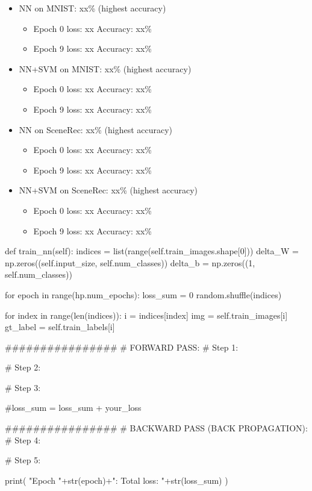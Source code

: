 \begin{itemize}
\item NN on MNIST: xx\% (highest accuracy)
	\begin{itemize}
	\item Epoch 0 loss: xx     Accuracy: xx\%
	\item Epoch 9 loss: xx     Accuracy: xx\%
	\end{itemize}
\item NN+SVM on MNIST: xx\% (highest accuracy)
	\begin{itemize}
	\item Epoch 0 loss: xx     Accuracy: xx\%
	\item Epoch 9 loss: xx     Accuracy: xx\%
	\end{itemize}
\item NN on SceneRec: xx\% (highest accuracy)
	\begin{itemize}
	\item Epoch 0 loss: xx     Accuracy: xx\%
	\item Epoch 9 loss: xx     Accuracy: xx\%
	\end{itemize}
\item NN+SVM on SceneRec: xx\% (highest accuracy)
	\begin{itemize}
	\item Epoch 0 loss: xx     Accuracy: xx\%
	\item Epoch 9 loss: xx     Accuracy: xx\%
	\end{itemize}
\end{itemize}


\pagebreak
\begin{python}
def train_nn(self):
    indices = list(range(self.train_images.shape[0]))
    delta_W = np.zeros((self.input_size, self.num_classes))
    delta_b = np.zeros((1, self.num_classes))

    for epoch in range(hp.num_epochs):
	   loss_sum = 0
        random.shuffle(indices)

        for index in range(len(indices)):
            i = indices[index]
            img = self.train_images[i]
            gt_label = self.train_labels[i]

            ################
            # FORWARD PASS:
            # Step 1:

            # Step 2:

            # Step 3:
                
            #loss_sum = loss_sum + your_loss
                
            ################
            # BACKWARD PASS (BACK PROPAGATION):            
            # Step 4:                

            # Step 5:
                
       print( "Epoch "+str(epoch)+": Total loss: "+str(loss_sum) )
\end{python}


